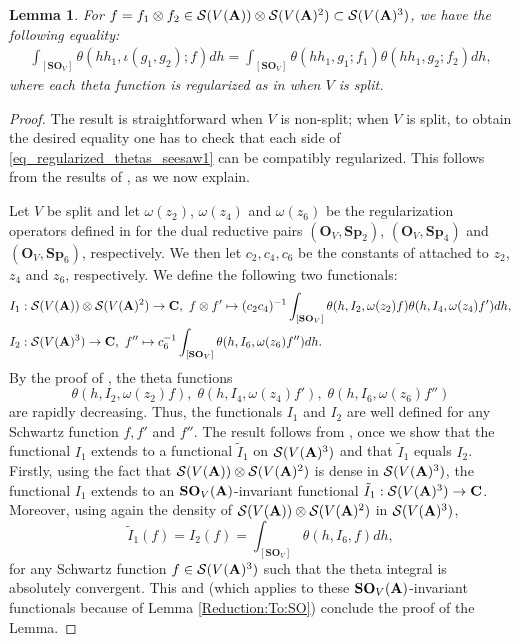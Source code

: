 \documentclass[11pt, reqno]{amsart}
\theoremstyle{plain}
\newtheorem{lemma}[theorem]{Lemma}
\theoremstyle{definition}
\theoremstyle{remark}
\theoremstyle{plain}
\def\C{{\bf C}}
\def\A{{\bf A}}
\def\Sp{{\mathbf{Sp}}}
\begin{document}
\begin{lemma}\label{Factorization:Regularization}
For $f = f_1\otimes f_2\in \mathcal{S}(V(\A))\otimes \mathcal{S}(V(\A)^2)\subset \mathcal{S}(V(\A)^3)$, we have the following equality:
\begin{align}\label{eq_regularized_thetas_seesaw1}
    \int_{[\mathbf{SO}_V]}\theta(hh_1, \iota( g_1  , g_2) ; f)dh = \int_{[\mathbf{SO}_V]}\theta(hh_1 , g_1; f_1)\theta(hh_1, g_2 ; f_2)dh,
\end{align}
where each theta function is regularized as in \cite{IchinoSW} when $V$ is split.
\end{lemma}
\begin{proof}
The result is straightforward when $V$ is non-split; when $V$ is split, to obtain the desired equality one has to check that each side of \eqref{eq_regularized_thetas_seesaw1} can be compatibly regularized. This follows from the results of \cite{IchinoSW}, as we now explain.
    
    Let $V$ be split and let $\omega(z_2)$, $\omega(z_4)$ and $\omega(z_6)$ be the regularization operators defined in \cite[Lemma 1.3]{IchinoSW} for the dual reductive pairs $(\mathbf{O}_V,\Sp_2)$, $(\mathbf{O}_V,\Sp_4)$ and $(\mathbf{O}_V,\Sp_6)$, respectively. We then let $c_2,c_4,c_6$ be the constants of \cite[Lemma 1.6]{IchinoSW} attached to $z_2$, $z_4$ and $z_6$, respectively. We define the following two functionals: 
      \begin{align*}
    I_1 &: \mathcal{S}(V(\A))\otimes \mathcal{S}(V(\A)^2)\to \C,\,\, f\otimes f'\mapsto (c_2c_4)^{-1}\int_{[\mathbf{SO}_V]}\theta(h,I_2,\omega(z_2)f)\theta(h,I_4,\omega(z_4)f')dh,\\
    I_2 &: \mathcal{S}(V(\A)^3)\to \C,\,\, f''  \mapsto c_{6}^{-1}\int_{[\mathbf{SO}_V]}\theta(h,I_6,\omega(z_6)f'')dh.\end{align*} 
    By the proof of \cite[Proposition 1.5]{IchinoSW}, the theta functions \[\theta(h,I_2,\omega(z_2)f),\;\theta(h,I_4,\omega(z_4)f'),\;\theta(h,I_6,\omega(z_6)f'')\] are rapidly decreasing. Thus, the functionals $I_1$ and $I_2$ are well defined for any Schwartz function $f, f'$ and $f''$. The result follows from \cite[Lemma 1.9]{IchinoSW}, once we show that the functional $I_1$ extends to a functional $\tilde{I}_1$ on $\mathcal{S}(V(\A)^3)$ and that $\tilde{I}_1$ equals $I_2$.
 Firstly, using the fact that $\mathcal{S}(V(\A))\otimes \mathcal{S}(V(\A)^2)$ is dense in $\mathcal{S}(V(\A)^3)$, the functional $I_1$ extends to an $\mathbf{SO}_V(\A)$-invariant functional $\tilde{I}_1 : \mathcal{S}(V(\A)^3)\to \C$. Moreover, using again the density of  $\mathcal{S}(V(\A))\otimes \mathcal{S}(V(\A)^2)$ in $\mathcal{S}(V(\A)^3)$,  $$\tilde{I}_1(f) = I_2(f) = \int_{[\mathbf{SO}_V]}\theta(h,I_6,f)dh,$$ for any Schwartz function $f \in \mathcal{S}(V(\A)^3)$ such that the theta integral is absolutely convergent.  This and \cite[Lemma 1.9]{IchinoSW} (which applies to these $\mathbf{SO}_V(\A)$-invariant functionals because of Lemma \ref{Reduction:To:SO}) conclude the proof of the Lemma.
\end{proof}
\end{document}
